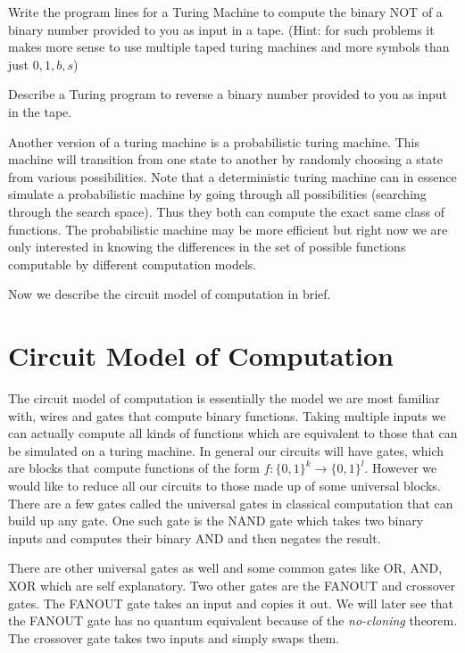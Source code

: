\begin{exercise}
Write the program lines for a Turing Machine to compute the binary NOT of a binary number provided to you as input in a tape.
(Hint: for such problems it makes more sense to use multiple taped turing machines and more symbols than just $0, 1, b, s$)
\end{exercise}
\begin{exercise}
Describe a Turing program to reverse a binary number provided to you as input in the tape.
\end{exercise}
Another version of a turing machine is a probabilistic turing machine. This machine will transition from one state to another by randomly choosing a state from various possibilities. Note that a deterministic turing machine can in essence simulate a probabilistic machine by going through all possibilities (searching through the search space). Thus they both can compute the exact same class of functions. The probabilistic machine may be more efficient but right now we are only interested in knowing the differences in the set of possible functions computable by different computation models.

Now we describe the circuit model of computation in brief.

\section{Circuit Model of Computation}
The circuit model of computation is essentially the model we are most familiar with, wires and gates that compute binary functions. Taking multiple inputs we can actually compute all kinds of functions which are equivalent to those that can be simulated on a turing machine.  In general our circuits will have gates, which are blocks that compute functions of the form $f : \{0, 1 \}^{k} \to \{0, 1\}^{l}$. However we would like to reduce all our circuits to those made up of some universal blocks. There are a few gates called the universal gates in classical computation that can build up any gate. One such gate is the NAND gate which takes two binary inputs and computes their binary AND and then negates the result.

There are other universal gates as well and some common gates like OR, AND, XOR which are self explanatory. Two other gates are the FANOUT and crossover gates. The FANOUT gate takes an input and copies it out. We will later see that the FANOUT gate has no quantum equivalent because of the \textit{no-cloning} theorem. The crossover gate takes two inputs and simply swaps them.

